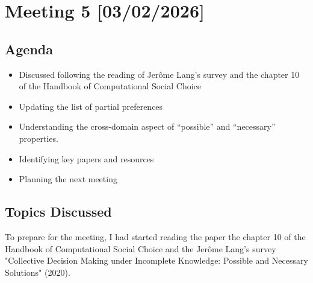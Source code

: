 \documentclass{article}
\begin{document}
\newpage

\section{Meeting 5 [03/02/2026]}

\subsection{Agenda}
\begin{itemize}
    \item Discussed following the reading of Jerôme Lang's survey and the chapter 10 of the Handbook of Computational Social Choice
    \item Updating the list of partial preferences
    \item Understanding the cross-domain aspect of “possible” and “necessary” properties.
    \item Identifying key papers and resources
    \item Planning the next meeting
\end{itemize}

\subsection{Topics Discussed}

To prepare for the meeting, I had started reading the paper the chapter 10 of the Handbook of Computational Social Choice and the Jerôme Lang's survey "Collective Decision Making under Incomplete Knowledge:
Possible and Necessary Solutions" (2020). 
\end{document}
